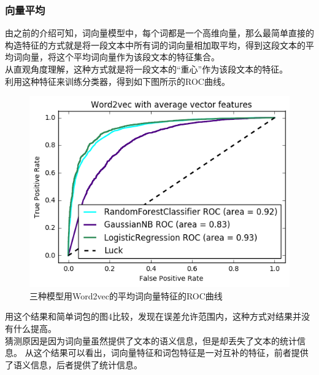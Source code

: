 \subsubsection{向量平均}
由之前的介绍可知，词向量模型中，每个词都是一个高维向量，那么最简单直接的构造特征的方式就是将一段文本中所有词的词向量相加取平均，得到这段文本的平均词向量，将这个平均词向量作为该段文本的特征集合。\\
从直观角度理解，这种方式就是将一段文本的“重心”作为该段文本的特征。\\
利用这种特征来训练分类器，得到如下图所示的ROC曲线。
\begin{figure}[h]
\centering
\includegraphics[width=0.9\linewidth]{3c_word2vec_average}
\caption[word2vec_average]{三种模型用Word2vec的平均词向量特征的ROC曲线}
\label{fig:3cword2vecaverage}
\end{figure}
用这个结果和简单词包的图4比较，发现在误差允许范围内，这种方式对结果并没有什么提高。\\
猜测原因是因为词向量虽然提供了文本的语义信息，但是却丢失了文本的统计信息。
从这个结果可以看出，词向量特征和词包特征是一对互补的特征，前者提供了语义信息，后者提供了统计信息。\\